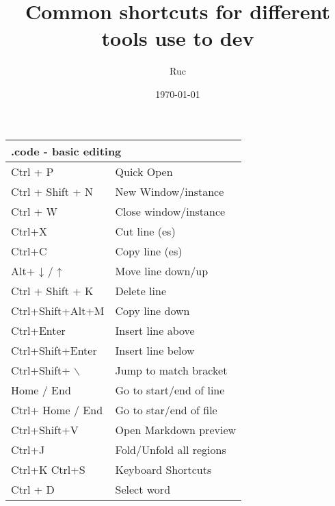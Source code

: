 \documentclass{article}
\title{ Common shortcuts for different tools use to dev}
\author{ Ruc }
\date{\today}
\begin{document}
\maketitle

\newpage
\begin{landscape}
    \begin{multicols*}{3}
        \begin{tabular}{m{3cm}m{5cm}}
            \multicolumn{2}{l}{\textbf{.code - basic editing  }} \\
            \hline
            Ctrl + P                 & Quick Open                \\
            \rowcolor{LightCyan}
            Ctrl + Shift + N         & New Window/instance       \\
            Ctrl + W                 & Close window/instance     \\
            \rowcolor{LightCyan}
            Ctrl+X                   & Cut line (es)             \\
            Ctrl+C                   & Copy line (es)            \\
            \rowcolor{LightCyan}
            Alt+ ↓ / ↑               & Move line down/up         \\
            Ctrl + Shift + K         & Delete line               \\
            \rowcolor{LightCyan}
            Ctrl+Shift+Alt+M         & Copy line down            \\
            Ctrl+Enter               & Insert line above         \\
            \rowcolor{LightCyan}
            Ctrl+Shift+Enter         & Insert line below         \\
            Ctrl+Shift+ $\backslash$ & Jump to match bracket     \\
            \rowcolor{LightCyan}
            Home / End               & Go to start/end of line   \\
            Ctrl+ Home / End         & Go to star/end of file    \\
            \rowcolor{LightCyan}
            Ctrl+Shift+V             & Open Markdown preview     \\
            Ctrl+J                   & Fold/Unfold all regions   \\
            \rowcolor{LightCyan}
            Ctrl+K Ctrl+S            & Keyboard Shortcuts        \\
            Ctrl + D                 & Select word               \\

\end{tabular}
\end{multicols*}
\end{landscape}
\end{document}
